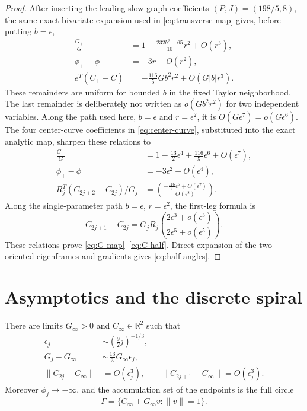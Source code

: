 \documentclass[smallextended,envcountsame]{svjour3}
\newcommand{\R}{\mathbb R}
\begin{document}
\begin{proof}
After inserting the leading slow-graph coefficients
$(P,J)=(198/5,8)$, the same exact bivariate expansion used in
\eqref{eq:transverse-map} gives, before putting $b=\epsilon$,
\begin{align*}
\frac{G_+}{G}
&=1+\frac{232b^2-65}{10}r^2+O(r^3),\\
\phi_+-\phi&=-3r+O(r^2),\\
e^T(C_+-C)&=-\frac{116}{5}Gb^2r^2+O(G|b|r^3).
\end{align*}
These remainders are uniform for bounded $b$ in the fixed Taylor
neighborhood.  The last remainder is deliberately not written as
$o(Gb^2r^2)$ for two independent variables.  Along the path used here,
$b=\epsilon$ and $r=\epsilon^2$, it is
$O(G\epsilon^7)=o(G\epsilon^6)$.
The four center-curve coefficients in \eqref{eq:center-curve}, substituted
into the exact analytic map, sharpen these relations to
\begin{align*}
\frac{G_+}{G}
&=1-\frac{13}{2}\epsilon^4
+\frac{116}{5}\epsilon^6+O(\epsilon^7),\\
\phi_+-\phi&=-3\epsilon^2+O(\epsilon^4),\\
R_j^T(C_{2j+2}-C_{2j})/G_j
&=\binom{-\frac{116}{5}\epsilon^6+O(\epsilon^7)}
{O(\epsilon^8)}.
\end{align*}
Along the single-parameter path $b=\epsilon$, $r=\epsilon^2$, the first-leg
formula is
\[
C_{2j+1}-C_{2j}
=G_jR_j\binom{2\epsilon^3+o(\epsilon^3)}
{2\epsilon^5+o(\epsilon^5)}.
\]
These relations prove
\eqref{eq:G-map}--\eqref{eq:C-half}.  Direct expansion of the two oriented
eigenframes and gradients gives \eqref{eq:half-angles}.
\end{proof}

\section{Asymptotics and the discrete spiral}
\label{sec:spiral}

\begin{lemma}\label{lem:scalar-asymptotics}
There are limits $G_\infty>0$ and $C_\infty\in\R^2$ such that
\begin{align}
\epsilon_j&\sim\left(\frac92j\right)^{-1/3},
\label{eq:epsilon-asymptotic}\\
G_j-G_\infty&\sim\frac{13}{3}G_\infty\epsilon_j,
\label{eq:G-tail}\\
\|C_{2j}-C_\infty\|&=O(\epsilon_j^3),
\qquad
\|C_{2j+1}-C_\infty\|=O(\epsilon_j^3).
\label{eq:C-tail}
\end{align}
Moreover $\phi_j\to-\infty$, and the accumulation set of the endpoints is
the full circle
\begin{equation}\label{eq:limit-circle}
\Gamma=\{C_\infty+G_\infty v:\|v\|=1\}.
\end{equation}
\end{lemma}
\end{document}

